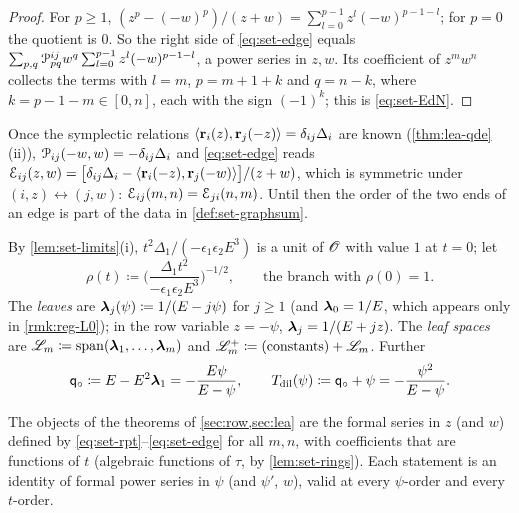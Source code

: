 \begin{proof}
For $p\geq1$, $(z^p-(-w)^p)/(z+w)=\sum_{l=0}^{p-1}z^l(-w)^{p-1-l}$; for $p=0$ the quotient is $0$. So the right side of \eqref{eq:set-edge} equals $\sum_{p,q}\mathcal{P}^{ij}_{pq}w^q\sum_{l=0}^{p-1}z^l(-w)^{p-1-l}$, a power series in $z,w$. Its coefficient of $z^mw^n$ collects the terms with $l=m$, $p=m+1+k$ and $q=n-k$, where $k=p-1-m\in[0,n]$, each with the sign $(-1)^k$; this is \eqref{eq:set-EdN}.
\end{proof}

\begin{rmk}
\label{rmk:set-edgesym}
Once the symplectic relations $\langle\mathbf{r}_i(z),\mathbf{r}_j(-z)\rangle=\delta_{ij}\Delta_i$ are known (\cref{thm:lea-qde}(ii)), $\mathcal{P}_{ij}(-w,w)=-\delta_{ij}\Delta_i$ and \eqref{eq:set-edge} reads $\mathcal{E}_{ij}(z,w)=\big[\delta_{ij}\Delta_i-\langle\mathbf{r}_i(-z),\mathbf{r}_j(-w)\rangle\big]/(z+w)$, which is symmetric under $(i,z)\leftrightarrow(j,w)$: $\mathcal{E}_{ij}(m,n)=\mathcal{E}_{ji}(n,m)$. Until then the order of the two ends of an edge is part of the data in \cref{def:set-graphsum}.
\end{rmk}

\begin{defn}
\label{def:set-rho}
By \cref{lem:set-limits}(i), $t^2\Delta_1/(-\epsilon_1\epsilon_2E^3)$ is a unit of $\mathscr{O}$ with value $1$ at $t=0$; let
\[
\rho(t)\coloneqq\Big(\frac{\Delta_1t^2}{-\epsilon_1\epsilon_2E^3}\Big)^{-1/2},\qquad\text{the branch with }\rho(0)=1 .
\]
The \emph{leaves} are $\boldsymbol{\lambda}_j(\psi)\coloneqq1/(E-j\psi)$ for $j\geq1$ (and $\boldsymbol{\lambda}_0=1/E$, which appears only in \cref{rmk:reg-L0}); in the row variable $z=-\psi$, $\boldsymbol{\lambda}_j=1/(E+jz)$. The \emph{leaf spaces} are $\mathscr{L}_m\coloneqq\mathrm{span}(\boldsymbol{\lambda}_1,\ldots,\boldsymbol{\lambda}_m)$ and $\mathscr{L}_m^+\coloneqq(\text{constants})+\mathscr{L}_m$. Further
\[
\mathsf{q}_{\circ}\coloneqq E-E^2\boldsymbol{\lambda}_1=-\frac{E\psi}{E-\psi},\qquad T_{\mathrm{dil}}(\psi)\coloneqq\mathsf{q}_{\circ}+\psi=-\frac{\psi^2}{E-\psi}.
\]
\end{defn}

\begin{rmk}[Scope]
\label{rmk:set-scope}
The objects of the theorems of \cref{sec:row,sec:lea} are the formal series in $z$ (and $w$) defined by \eqref{eq:set-rpt}--\eqref{eq:set-edge} for all $m,n$, with coefficients that are functions of $t$ (algebraic functions of $\tau$, by \cref{lem:set-rings}). Each statement is an identity of formal power series in $\psi$ (and $\psi'$, $w$), valid at every $\psi$-order and every $t$-order.
\end{rmk}

